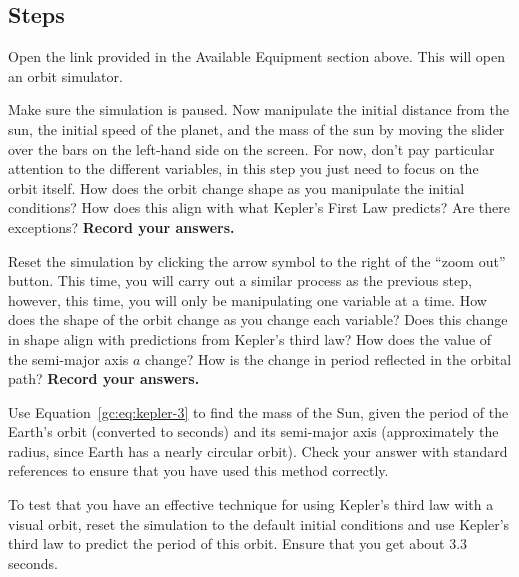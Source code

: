 \subsection{Steps}
\begin{steps}
	\item Open the link provided in the Available Equipment section above. This will open an orbit simulator.
	
	\item Make sure the simulation is paused. Now manipulate the initial distance from the sun, the initial speed of the planet, and the mass of the sun by moving the slider over the bars on the left-hand side on the screen. For now, don't pay particular attention to the different variables, in this step you just need to focus on the orbit itself. How does the orbit change shape as you manipulate the initial conditions? How does this align with what Kepler's First Law predicts? Are there exceptions? \textbf{Record your answers.}
	
	\item Reset the simulation by clicking the arrow symbol to the right of the ``zoom out'' button. This time, you will carry out a similar process as the previous step, however, this time, you will only be manipulating one variable at a time. How does the shape of the orbit change as you change each variable? Does this change in shape align with predictions from Kepler's third law? How does the value of the semi-major axis $a$ change? How is the change in period reflected in the orbital path? \textbf{Record your answers.}
	
	\item Use Equation~\ref{gc:eq:kepler-3} to find the mass of the Sun, given the period of the Earth's orbit (converted to seconds) and its semi-major axis (approximately the radius, since Earth has a nearly circular orbit). Check your answer with standard references to ensure that you have used this method correctly.

	\item To test that you have an effective technique for using Kepler's third law with a visual orbit, reset the simulation to the default initial conditions and use Kepler's third law to predict the period of this orbit. Ensure that you get about $3.3\:$seconds.

	

\end{steps}
